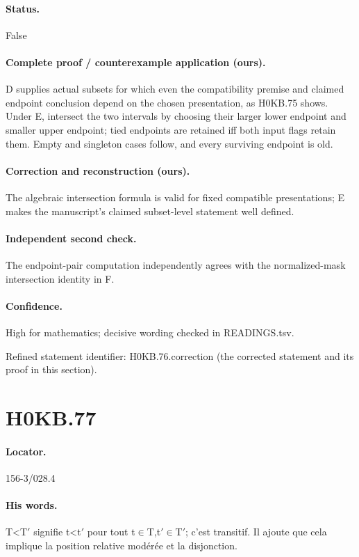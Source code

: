 \paragraph{Status.} False

\paragraph{Complete proof / counterexample application (ours).} D supplies actual subsets for which even the compatibility premise and claimed endpoint conclusion depend on the chosen presentation, as H0KB.75 shows. Under E, intersect the two intervals by choosing their larger lower endpoint and smaller upper endpoint; tied endpoints are retained iff both input flags retain them. Empty and singleton cases follow, and every surviving endpoint is old.

\paragraph{Correction and reconstruction (ours).} The algebraic intersection formula is valid for fixed compatible presentations; E makes the manuscript’s claimed subset-level statement well defined.

\paragraph{Independent second check.} The endpoint-pair computation independently agrees with the normalized-mask intersection identity in F.

\paragraph{Confidence.} High for mathematics; decisive wording checked in READINGS.tsv.

\noindent Refined statement identifier: H0KB.76.correction (the corrected statement and its proof in this section).

\section*{H0KB.77}\label{statement:H0KB.77}
\paragraph{Locator.} 156-3/028.4

\paragraph{His words.} T<T\ensuremath{\prime} signifie t<t\ensuremath{\prime} pour tout t\ensuremath{\in}T,t\ensuremath{\prime}\ensuremath{\in}T\ensuremath{\prime}; c’est transitif. Il ajoute que cela implique la position relative modérée et la disjonction.

